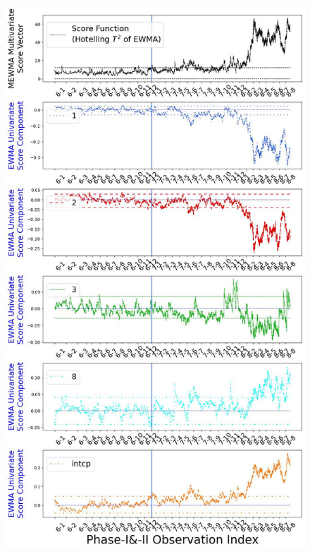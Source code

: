 \documentclass[twoside,11pt]{article}
\begin{document}

\begin{figure}[H]
\centering
\includegraphics[width = 0.48\linewidth]{../figures/v14/credit_default/logi_scal_PI_train_sample_weights/Compressed_pos_single_credit_mlines_with_regu_1e-08_0_0001_0_001_99_0.png}

\end{figure}
\end{document}
